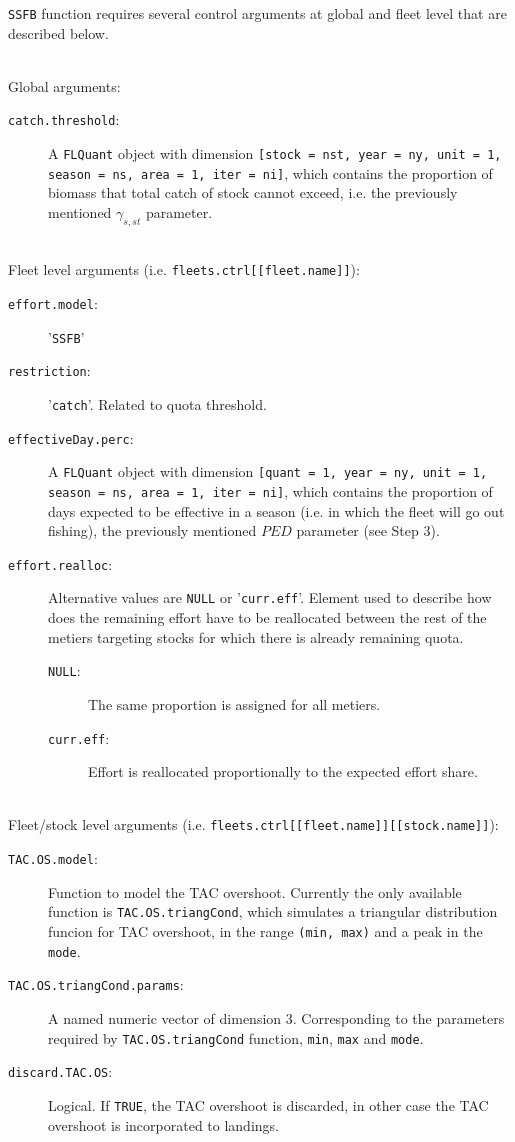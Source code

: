   \texttt{SSFB} function requires several control arguments at global and fleet level that are described below.

  \quad\\
  \noindent Global arguments:
  \begin{description}
    \item[\texttt{catch.threshold}:] A \texttt{FLQuant} object with dimension \texttt{[stock = nst, year = ny, unit = 1, season = ns, area = 1, iter = ni]}, which contains the proportion of biomass that total catch of stock cannot exceed, i.e. the previously mentioned $\gamma_{s,st}$ parameter.
  \end{description}

  \quad\\
  \noindent Fleet level arguments (i.e. \texttt{fleets.ctrl[[fleet.name]]}):
  \begin{description}
  	\item[\texttt{effort.model}:] '\texttt{SSFB}'
  	\item[\texttt{restriction}:] '\texttt{catch}'. Related to quota threshold.
    \item[\texttt{effectiveDay.perc}:] A  \texttt{FLQuant} object with dimension \texttt{[quant = 1, year = ny, unit = 1, season = ns, area = 1, iter = ni]}, which contains the proportion of days expected to be effective in a season (i.e. in which the fleet will go out fishing), the previously mentioned $PED$ parameter (see Step 3).
  	\item[\texttt{effort.realloc}:] Alternative values are \texttt{NULL} or '\texttt{curr.eff}'. Element used to describe how does the remaining effort have to be reallocated between the rest of the metiers targeting stocks for which there is already remaining quota.
  		\begin{description}
  			\item[\texttt{NULL}:] The same proportion is assigned for all metiers.
  			\item[\texttt{curr.eff}:] Effort is reallocated proportionally to the expected effort share. 
  		\end{description}
  \end{description}
  
  \quad\\
  \noindent Fleet/stock level arguments (i.e. \texttt{fleets.ctrl[[fleet.name]][[stock.name]]}):
  \begin{description}
    \item[\texttt{TAC.OS.model}:] Function to model the TAC overshoot. 
      Currently the only available function is \texttt{TAC.OS.triangCond}, which simulates a triangular distribution funcion 
      for TAC overshoot, in the range \texttt{(min, max)} and a peak in the \texttt{mode}.
    \item[\texttt{TAC.OS.triangCond.params}:] A named numeric vector of dimension 3. 
      Corresponding to the parameters required by \texttt{TAC.OS.triangCond} function, \texttt{min}, \texttt{max} and \texttt{mode}.
    \item[\texttt{discard.TAC.OS}:] Logical. If \texttt{TRUE}, the TAC overshoot is discarded, in other case the TAC overshoot
      is incorporated to landings.
  \end{description}


